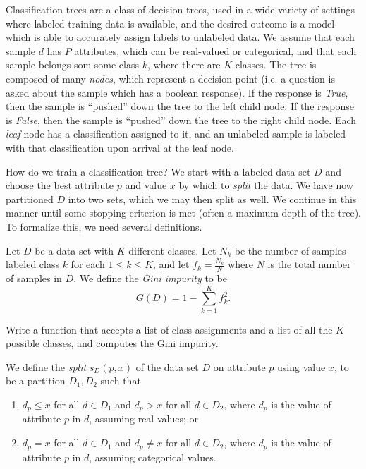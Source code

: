 

Classification trees are a class of decision trees, used in a wide variety of settings where labeled training data is available, and the desired outcome is a model which is able to accurately assign labels to unlabeled data. We assume that each sample $d$ has $P$ attributes, which can be real-valued or categorical, and that each sample belongs som some class $k$, where there are $K$ classes. The tree is composed of many \emph{nodes}, which represent a decision point (i.e. a question is asked about the sample which has a boolean response). If the response is \emph{True}, then the sample is ``pushed'' down the tree to the left child node. If the response is \emph{False}, then the sample is ``pushed'' down the tree to the right child node. Each \emph{leaf} node has a classification assigned to it, and an unlabeled sample is labeled with that classification upon arrival at the leaf node.

How do we train a classification tree? We start with a labeled data set $D$ and choose the best attribute $p$ and value $x$ by which to \emph{split} the data. We have now partitioned $D$ into two sets, which we may then split as well. We continue in this manner until some stopping criterion is met (often a maximum depth of the tree). To formalize this, we need several definitions.

\begin{definition}
Let $D$ be a data set with $K$ different classes. Let $N_{k}$ be the number of samples labeled class $k$ for each $1 \leq k \leq K$, and let $f_{k} = \frac{N_{k}}{N}$ where $N$ is the total number of samples in $D$. We define the \emph{Gini impurity} to be $$G(D) = 1 - \sum_{k=1}^{K} f_{k}^{2}.$$
\end{definition}

\begin{problem}
Write a function that accepts a list of class assignments and a list of all the $K$ possible classes, and computes the Gini impurity.
\end{problem}

\begin{definition}
We define the \emph{split} $s_{D}(p,x)$ of the data set $D$ on attribute $p$ using value $x$, to be a partition $D_{1},D_{2}$ such that 
\begin{enumerate}
	\item $d_{p} \leq x$ for all $d \in D_{1}$ and $d_{p} > x$ for all $d \in D_{2}$, where $d_{p}$ is the value of attribute $p$ in $d$, assuming real values; or \\
	\item $d_{p} = x$ for all $d \in D_{1}$ and $d_{p} \neq x$ for all $d \in D_{2}$, where $d_{p}$ is the value of attribute $p$ in $d$, assuming categorical values.
\end{enumerate}
\end{definition}


